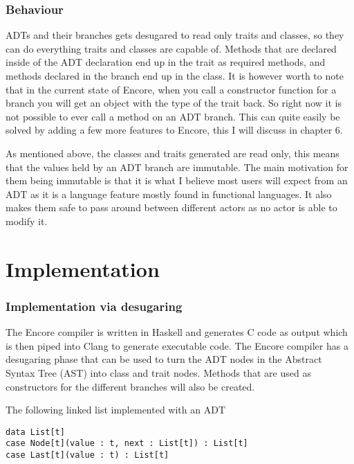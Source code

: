 \documentclass[10pt]{report}
\begin{document}
{\subsection{Behaviour}
\par{ADTs and their branches gets desugared to read only traits and classes, so they can do everything traits and classes are capable of. Methods that are declared inside of the ADT declaration end up in the trait as required methods, and methods declared in the branch end up in the class. It is however worth to note that in the current state of Encore, when you call a constructor function for a branch you will get an object with the type of the trait back. So right now it is not possible to ever call a method on an ADT branch. This can quite easily be solved by adding a few more features to Encore, this I will discuss in chapter 6.}
\par{As mentioned above, the classes and traits generated are read only, this means that the values held by an ADT branch are immutable.  The main motivation for them being immutable is that it is what I believe most users will expect from an ADT as it is a language feature mostly found in functional languages. It also makes them safe to pass around between different actors as no actor is able to modify it.}
\chapter{Implementation}

\subsection{Implementation via desugaring}
\par{The Encore compiler is written in Haskell and generates C code as output which is then piped into Clang to generate executable code. The Encore compiler has a desugaring phase that can be used to turn the ADT nodes in the Abstract Syntax Tree (AST) into class and trait nodes. Methods that are used as constructors for the different branches will also be created.}
\par{The following linked list implemented with an ADT}

\begin{lstlisting}[language=encore,caption={Linked list before it has been desugared}]
data List[t]
case Node[t](value : t, next : List[t]) : List[t]
case Last[t](value : t) : List[t]
\end{lstlisting}

}
\end{document}
